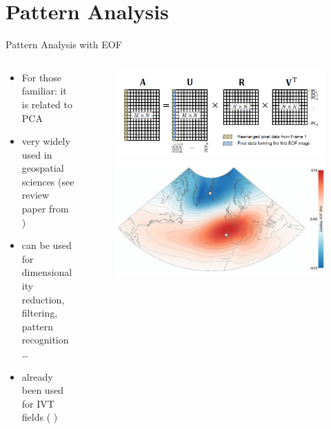 \section{Pattern Analysis}

\begin{frame}{Pattern Analysis with EOF}
  \begin{columns}
    \begin{column}{.5\textwidth}
      \begin{itemize}
        \item For those familiar: it is related to PCA
        \item very widely used in geospatial sciences (see review paper from \citeauthor{hannachi_empirical_2007} \cite{hannachi_empirical_2007})
        \item can be used for dimensionality reduction, filtering, pattern recognition \dots
        \item already been used for IVT fields (\citeauthor{ayantobo_integrated_2022} \cite{ayantobo_integrated_2022})
      \end{itemize} 
      
    \end{column}
    \begin{column}{.5\textwidth}
    \begin{figure}[t]
      \centering
      \includegraphics[width=\columnwidth]{imglib/svd_matrices.png}
      \includegraphics[width=.7\columnwidth]{imglib/nao_eof_index.png}
    \end{figure}

    \end{column}
    
  \end{columns}
\end{frame}

